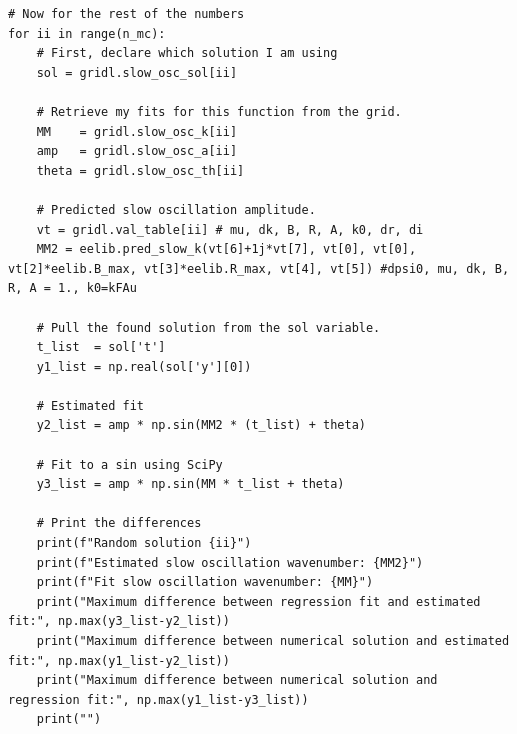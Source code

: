 \documentclass{article}
\begin{document}
\begin{lstlisting}
# Now for the rest of the numbers
for ii in range(n_mc):
    # First, declare which solution I am using
    sol = gridl.slow_osc_sol[ii]

    # Retrieve my fits for this function from the grid.
    MM    = gridl.slow_osc_k[ii]
    amp   = gridl.slow_osc_a[ii]
    theta = gridl.slow_osc_th[ii]

    # Predicted slow oscillation amplitude.
    vt = gridl.val_table[ii] # mu, dk, B, R, A, k0, dr, di
    MM2 = eelib.pred_slow_k(vt[6]+1j*vt[7], vt[0], vt[0], vt[2]*eelib.B_max, vt[3]*eelib.R_max, vt[4], vt[5]) #dpsi0, mu, dk, B, R, A = 1., k0=kFAu

    # Pull the found solution from the sol variable.
    t_list  = sol['t']
    y1_list = np.real(sol['y'][0])

    # Estimated fit
    y2_list = amp * np.sin(MM2 * (t_list) + theta)

    # Fit to a sin using SciPy
    y3_list = amp * np.sin(MM * t_list + theta)

    # Print the differences
    print(f"Random solution {ii}")
    print(f"Estimated slow oscillation wavenumber: {MM2}")
    print(f"Fit slow oscillation wavenumber: {MM}")
    print("Maximum difference between regression fit and estimated fit:", np.max(y3_list-y2_list))
    print("Maximum difference between numerical solution and estimated fit:", np.max(y1_list-y2_list))
    print("Maximum difference between numerical solution and regression fit:", np.max(y1_list-y3_list))
    print("")\end{lstlisting}
\end{document}
